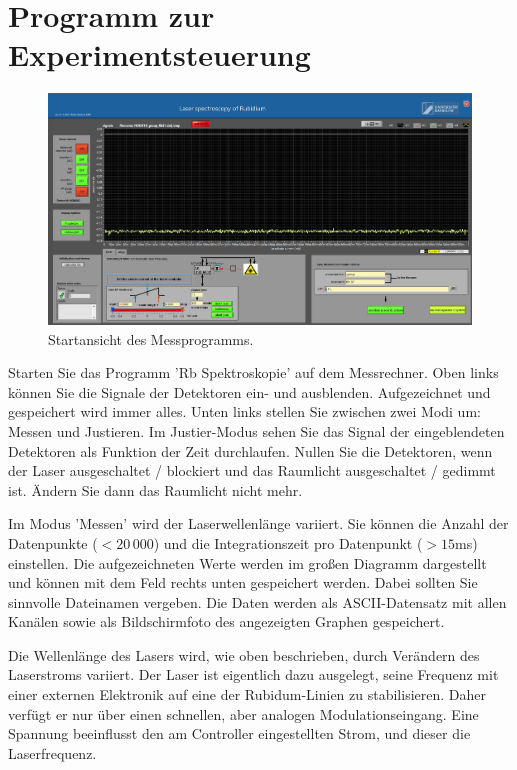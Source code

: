 \section{Programm zur Experimentsteuerung}


\begin{figure}
	\includegraphics[width=\textwidth]{bilder/startansicht.png}
	\caption{Startansicht des Messprogramms.}
	\label{Startansicht Messprogramm}
\end{figure}


Starten Sie das Programm 'Rb Spektroskopie' auf dem Messrechner. Oben links können Sie die Signale der  Detektoren ein- und ausblenden. Aufgezeichnet und gespeichert wird immer alles. Unten links stellen Sie zwischen zwei Modi um: Messen und Justieren. Im Justier-Modus sehen Sie das Signal der eingeblendeten Detektoren als Funktion der Zeit durchlaufen. Nullen Sie die Detektoren, wenn der Laser ausgeschaltet / blockiert und das Raumlicht ausgeschaltet / gedimmt  ist. Ändern Sie dann das Raumlicht nicht mehr.

Im Modus 'Messen' wird der Laserwellenlänge variiert. Sie können die Anzahl der Datenpunkte ($< 20 \, 000$) und die Integrationszeit pro Datenpunkt ($> 15$ms) einstellen. Die aufgezeichneten Werte werden im großen Diagramm dargestellt und können mit dem Feld rechts unten gespeichert werden. Dabei sollten Sie sinnvolle Dateinamen vergeben. Die Daten werden als ASCII-Datensatz mit allen Kanälen sowie als Bildschirmfoto des angezeigten Graphen gespeichert.

Die Wellenlänge des Lasers wird, wie oben beschrieben, durch Verändern des Laserstroms variiert. Der Laser ist eigentlich dazu ausgelegt, seine Frequenz mit einer externen Elektronik auf eine der Rubidum-Linien zu stabilisieren. Daher verfügt er nur über einen schnellen, aber analogen Modulationseingang. Eine Spannung beeinflusst den am Controller eingestellten Strom, und dieser die Laserfrequenz.

